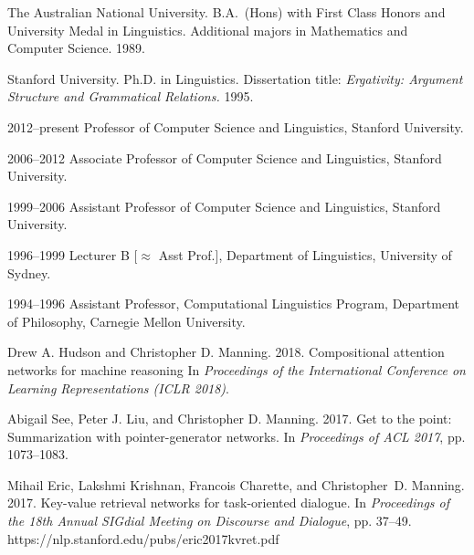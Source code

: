 \documentclass[11pt]{article}
\def\url#1{{\small\sf #1}}
\begin{document}
\begin{vita}
\begin{Professional Preparation}
\item The Australian National University. B.A.\ (Hons) with First Class Honors and University
Medal in Linguistics. Additional majors in Mathematics and Computer
Science. 1989.

\item Stanford University. Ph.D. in Linguistics.
Dissertation title: {\em Ergativity: Argument Structure and Grammatical
Relations.} 1995.

\end{Professional Preparation}

\begin{Appointments}[1996--present]
\item[2012--present] Professor of Computer Science and Linguistics,
  Stanford University.
\item[2006--2012] Associate Professor of Computer Science and
Linguistics, Stanford University.
\item[1999--2006] Assistant Professor of Computer Science and
Linguistics, Stanford University.
\item[1996--1999] Lecturer B [$\approx$ Asst Prof.], %
Department of Linguistics, University of Sydney. 
\item[1994--1996] Assistant Professor,
Computational Linguistics
Program, Department of Philosophy, Carnegie Mellon University.
\end{Appointments}

\begin{Products (most closely related)}

\item Drew A. Hudson and Christopher D. Manning. 2018. 
Compositional attention networks for machine reasoning
In {\em Proceedings of the International Conference on Learning
  Representations (ICLR 2018)}.

\item Abigail See, Peter J. Liu, and Christopher D. Manning. 2017. Get
  to the point: Summarization with pointer-generator networks. In
  \emph{Proceedings of ACL 2017}, pp. 1073--1083.

\item Mihail Eric, Lakshmi Krishnan, Francois Charette, and Christopher~D. Manning.
2017.
Key-value retrieval networks for task-oriented dialogue.
In {\em Proceedings of the 18th Annual SIGdial Meeting on Discourse and Dialogue}, pp. 37--49.
\url{https://nlp.stanford.edu/pubs/eric2017kvret.pdf}


\end{Products (most closely related)}
\end{vita}
\end{document}
